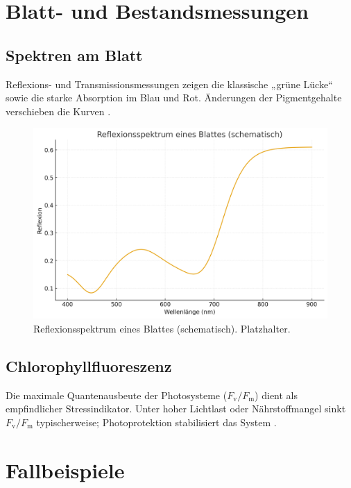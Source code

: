 \section{Blatt- und Bestandsmessungen}
\subsection{Spektren am Blatt}
Reflexions- und Transmissionsmessungen zeigen die klassische „grüne Lücke“ sowie die starke Absorption im Blau und Rot. Änderungen der Pigmentgehalte verschieben die Kurven \parencite{meyer2018photosynthese}.
\begin{figure}[H]
  \centering
  \includegraphics[width=.75\textwidth]{bilder/blattspektrum_demo.png}
  \caption{Reflexionsspektrum eines Blattes (schematisch). Platzhalter.}
  \label{fig:blatt_spektrum}
\end{figure}

\subsection{Chlorophyllfluoreszenz}
Die maximale Quantenausbeute der Photosysteme ($F_\mathrm{v}/F_\mathrm{m}$) dient als empfindlicher Stressindikator. Unter hoher Lichtlast oder Nährstoffmangel sinkt $F_\mathrm{v}/F_\mathrm{m}$ typischerweise; Photoprotektion stabilisiert das System \parencite{zhao2012chlorophyll, gao2010lightabsorption}.

\section{Fallbeispiele}

